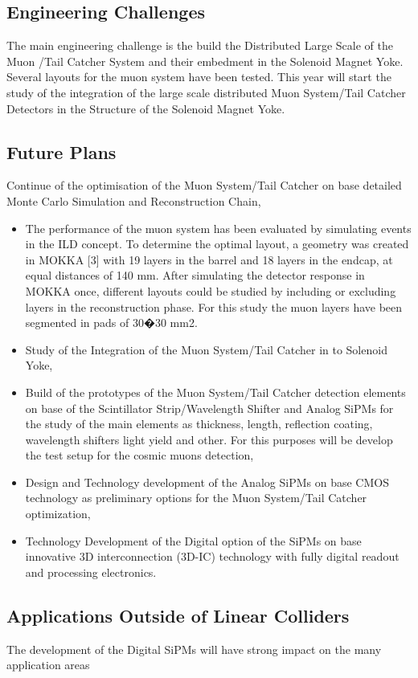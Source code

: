 \documentclass[12pt,twoside,a4paper]{book}
\begin{document}
\subsection{Engineering Challenges}
The main engineering challenge is the build the Distributed Large Scale of the Muon /Tail Catcher System and their embedment in the Solenoid Magnet Yoke.
Several layouts for the muon system have been tested.
This year will start the study of the integration of the large scale distributed Muon System/Tail Catcher Detectors in the Structure of the Solenoid Magnet Yoke.

\subsection{Future Plans}
Continue of the optimisation of the Muon System/Tail Catcher on base detailed Monte Carlo Simulation and Reconstruction Chain,
\begin{itemize}
\item The performance of the muon system has been evaluated by simulating events in the ILD concept. To determine the optimal layout,
a geometry was created in MOKKA [3] with 19 layers in the barrel and 18 layers in the endcap, at equal distances of 140 mm. After simulating the detector response
in  MOKKA once, different layouts could be studied by including or excluding layers in the reconstruction phase. For this study the muon layers have been segmented in pads of 30�30 mm2.

\item Study of the Integration of the Muon System/Tail Catcher in to Solenoid Yoke,
\item Build of the prototypes of the Muon System/Tail Catcher detection elements on base of the Scintillator Strip/Wavelength Shifter and Analog SiPMs for the study of the main elements as thickness, length, reflection coating, wavelength shifters light yield and other. For this purposes will be develop the test setup for the cosmic muons detection,
\item Design and Technology development of the Analog SiPMs on base CMOS technology as preliminary options for the Muon System/Tail Catcher optimization,
\item Technology Development of the Digital option of the SiPMs on base innovative 3D interconnection (3D-IC) technology with fully digital readout and processing electronics.
\end{itemize}

\subsection{Applications Outside of Linear Colliders}
The development of the Digital SiPMs will have strong impact on the many application areas
\end{document}
